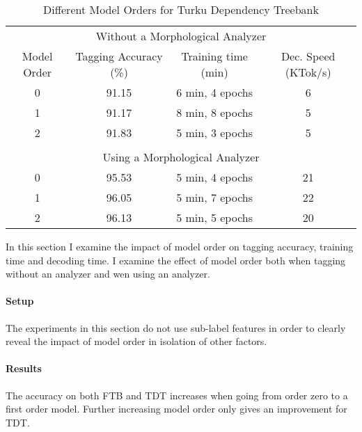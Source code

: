 \begin{table}[htb!]
\begin{center}
\begin{tabular}{cccc}
\multicolumn{4}{c}{Without a Morphological Analyzer}\\
Model Order & Tagging Accuracy (\%) & Training time (min) & Dec. Speed (KTok/s)\\
\hline
0        & 91.15            & 6 min, 4 epochs            & 6            \\
1        & 91.17            & 8 min, 8 epochs            & 5            \\
2        & 91.83            & 5 min, 3 epochs            & 5            \\
                &                       &                  &            \\
\multicolumn{4}{c}{Using a Morphological Analyzer}\\
\hline
0        & 95.53            & 5 min, 4 epochs            & 21            \\
1        & 96.05            & 5 min, 7 epochs            & 22            \\
2        & 96.13            & 5 min, 5 epochs            & 20            \\

\end{tabular}
\caption{Different Model Orders for Turku Dependency Treebank}
\end{center}
\end{table}

In this section I examine the impact of model order on tagging
accuracy, training time and decoding time. I examine the effect of
model order both when tagging without an analyzer and wen using an
analyzer.

\paragraph{Setup} The experiments in this section do not use sub-label
features in order to clearly reveal the impact of model order in
isolation of other factors.

\paragraph{Results} The accuracy on both FTB and TDT increases when
going from order zero to a first order model. Further increasing
model order only gives an improvement for TDT.

